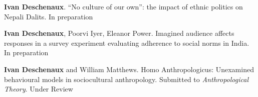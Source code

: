 


\begin{cvpublications}

  \cvpublication
  {\textbf{Ivan Deschenaux}. ``No culture of our own'': the impact of ethnic politics on Nepali Dalits.} %
    {In preparation} %

  \cvpublication
  {\textbf{Ivan Deschenaux}, Poorvi Iyer, Eleanor Power. Imagined audience affects responses in a survey experiment evaluating adherence to social norms in India.} %
    {In preparation} %

  \cvpublication
  {\textbf{Ivan Deschenaux} and William Matthews. Homo Anthropologicus: Unexamined behavioural models in sociocultural anthropology. Submitted to \textit{Anthropological Theory}.} %
    {Under Review} %

\end{cvpublications}


